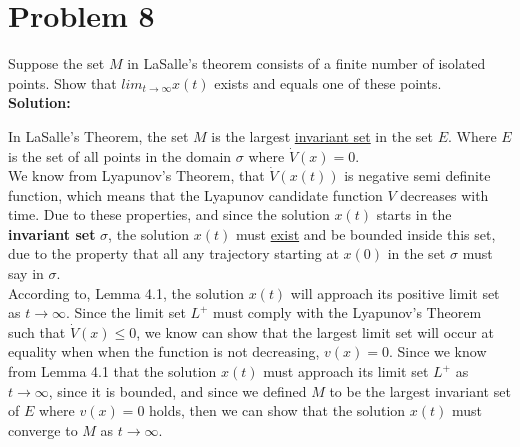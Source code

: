 \section*{Problem 8}


Suppose the set $M$ in LaSalle's theorem consists of a finite number of isolated points. Show that $lim_{t \rightarrow \infty} x(t)$ exists and equals one of these points.\\


\noindent \textbf{Solution:}

In LaSalle's Theorem, the set $M$ is the largest \underline{invariant set} in the set $E$. Where $E$ is the set of all points in the domain $\sigma$ where $\dot{V}(x) = 0$. \\

We know from Lyapunov's Theorem, that $\dot{V}(x(t))$ is negative semi definite function, which means that the Lyapunov candidate function $V$ decreases with time. Due to these properties, and since the solution $x(t)$ starts in the \textbf{invariant set}  $\sigma$, the solution $x(t)$ must \underline{exist} and be bounded inside this set, due to the property that all any trajectory starting at $x(0)$ in the set $\sigma$ must say in $\sigma$.  \\

According to, Lemma 4.1, the solution $x(t)$ will approach its positive limit set as $t\rightarrow \infty$. Since the limit set $L^+$ must comply with the Lyapunov's Theorem such that $\dot{V}(x) \leq 0 $, we know can show that the largest limit set will occur at equality when when the function is not decreasing, $v(x) = 0$. Since we know from Lemma 4.1 that the solution $x(t)$ must approach its limit set $L^+$ as $t \rightarrow \infty$, since it is bounded, and since we defined $M$ to be the largest invariant set of $E$ where $v(x) = 0$ holds, then we can show that the solution $x(t)$ must converge to $M$ as $t \rightarrow \infty$.
